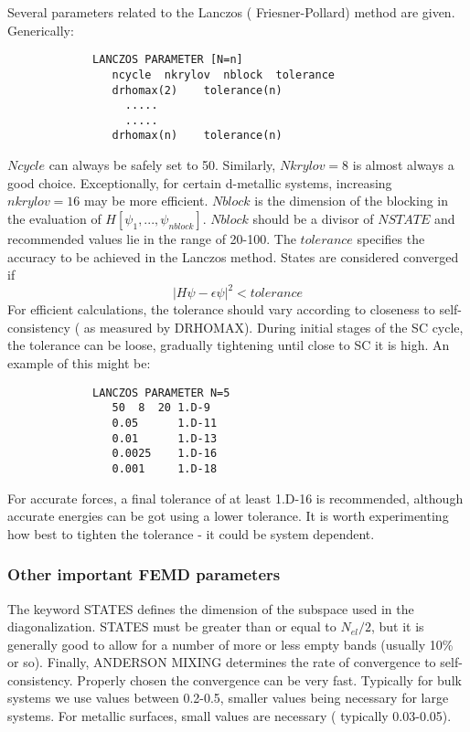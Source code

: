 \documentclass[twoside,10pt,titlepage,a4paper]{article}
\begin{document}
Several parameters related to the Lanczos ( Friesner-Pollard)
method are given. Generically:
\begin{verbatim}
             LANCZOS PARAMETER [N=n]
                ncycle  nkrylov  nblock  tolerance
                drhomax(2)    tolerance(n)
                  .....
                  .....
                drhomax(n)    tolerance(n)
\end{verbatim}
$Ncycle$ can always be safely set to 50. Similarly, $Nkrylov=8$ is almost
always a good choice. Exceptionally, for certain d-metallic systems, increasing
$nkrylov=16$ may be more efficient. $Nblock$ is the dimension of the blocking
in the evaluation of $H[\psi_1,...,\psi_{nblock}]$. $Nblock$ should be a
divisor of $NSTATE$ and recommended values lie in the range of 20-100. The
$tolerance$ specifies the accuracy to be achieved in the Lanczos method. States
are considered converged if
\begin{equation}
   |H\psi-\epsilon\psi|^2 < tolerance
\end{equation}
For efficient calculations, the tolerance should vary according to closeness to
self-consistency ( as measured by DRHOMAX). During initial stages of the SC
cycle, the tolerance can be loose, gradually tightening until close to SC it is
high. An example of this might be:
\begin{verbatim}
             LANCZOS PARAMETER N=5
                50  8  20 1.D-9
                0.05      1.D-11
                0.01      1.D-13
                0.0025    1.D-16
                0.001     1.D-18
\end{verbatim}
For accurate forces, a final tolerance of at least 1.D-16 is recommended,
although accurate energies can be got using a lower tolerance. It is worth
experimenting how best to tighten the tolerance - it could be system dependent.

\subsubsection{Other important FEMD parameters}

  The keyword STATES defines the dimension of the subspace used in the
diagonalization. STATES must be greater than or equal to $N_{el}/2$, but it is
generally good to allow for a number of more or less empty bands (usually 10\%
or so). Finally, ANDERSON MIXING determines the rate of convergence to
self-consistency. Properly chosen the convergence can be very fast. Typically
for bulk systems we use values between 0.2-0.5, smaller values being necessary
for large systems. For metallic surfaces, small values are necessary (
typically 0.03-0.05).
\end{document}
